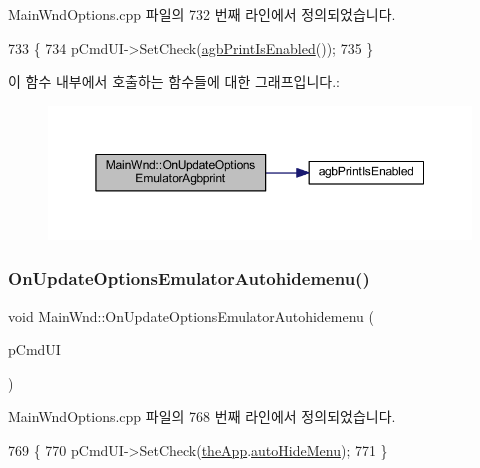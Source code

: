 Main\+Wnd\+Options.\+cpp 파일의 732 번째 라인에서 정의되었습니다.


\begin{DoxyCode}
733 \{
734   pCmdUI->SetCheck(\mbox{\hyperlink{agbprint_8cpp_ab6b9c9b8eb5e971359941e3b4923ced9}{agbPrintIsEnabled}}());
735 \}
\end{DoxyCode}
이 함수 내부에서 호출하는 함수들에 대한 그래프입니다.\+:
\nopagebreak
\begin{figure}[H]
\begin{center}
\leavevmode
\includegraphics[width=350pt]{class_main_wnd_aad1f7f9bff514babc68d81e52bdfdd92_cgraph}
\end{center}
\end{figure}
\mbox{\label{class_main_wnd_ad3cade08132d08c4db013a0d240cc729}} 
\subsubsection{\texorpdfstring{On\+Update\+Options\+Emulator\+Autohidemenu()}{OnUpdateOptionsEmulatorAutohidemenu()}}
{\footnotesize\ttfamily void Main\+Wnd\+::\+On\+Update\+Options\+Emulator\+Autohidemenu (\begin{DoxyParamCaption}\item[{C\+Cmd\+UI $\ast$}]{p\+Cmd\+UI }\end{DoxyParamCaption})\hspace{0.3cm}{\ttfamily [protected]}}



Main\+Wnd\+Options.\+cpp 파일의 768 번째 라인에서 정의되었습니다.


\begin{DoxyCode}
769 \{
770   pCmdUI->SetCheck(\mbox{\hyperlink{_v_b_a_8cpp_a8095a9d06b37a7efe3723f3218ad8fb3}{theApp}}.\mbox{\hyperlink{class_v_b_a_a19362d5508f73c0f93f307eef61d6915}{autoHideMenu}});
771 \}
\end{DoxyCode}
\mbox{\label{class_main_wnd_ae5a5c5ae891dd3cd876325b59a50465b}} 

